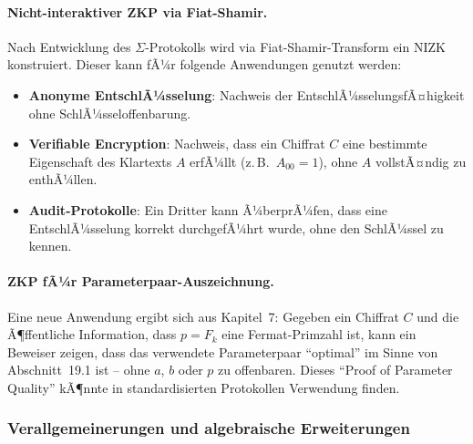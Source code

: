﻿\documentclass[a4paper,12pt]{scrreprt}
\theoremstyle{definition}
\begin{document}
\paragraph{Nicht-interaktiver ZKP via Fiat-Shamir.}
Nach Entwicklung des $\Sigma$-Protokolls wird via Fiat-Shamir-Transform \cite{BFM88} ein NIZK konstruiert. Dieser kann fÃ¼r folgende Anwendungen genutzt werden:
\begin{itemize}
    \item \textbf{Anonyme EntschlÃ¼sselung}: Nachweis der EntschlÃ¼sselungsfÃ¤higkeit ohne SchlÃ¼sseloffenbarung.
    \item \textbf{Verifiable Encryption}: Nachweis, dass ein Chiffrat $C$ eine bestimmte Eigenschaft des Klartexts $A$ erfÃ¼llt (z.\,B.\ $A_{00} = 1$), ohne $A$ vollstÃ¤ndig zu enthÃ¼llen.
    \item \textbf{Audit-Protokolle}: Ein Dritter kann Ã¼berprÃ¼fen, dass eine EntschlÃ¼sselung korrekt durchgefÃ¼hrt wurde, ohne den SchlÃ¼ssel zu kennen.
\end{itemize}

\paragraph{ZKP fÃ¼r Parameterpaar-Auszeichnung.}
Eine neue Anwendung ergibt sich aus Kapitel~7: Gegeben ein Chiffrat $C$ und die Ã¶ffentliche Information, dass $p = F_k$ eine Fermat-Primzahl ist, kann ein Beweiser zeigen, dass das verwendete Parameterpaar ``optimal'' im Sinne von Abschnitt~19.1 ist -- ohne $a$, $b$ oder $p$ zu offenbaren. Dieses ``Proof of Parameter Quality'' kÃ¶nnte in standardisierten Protokollen Verwendung finden.

\subsubsection{Verallgemeinerungen und algebraische Erweiterungen}
\end{document}
